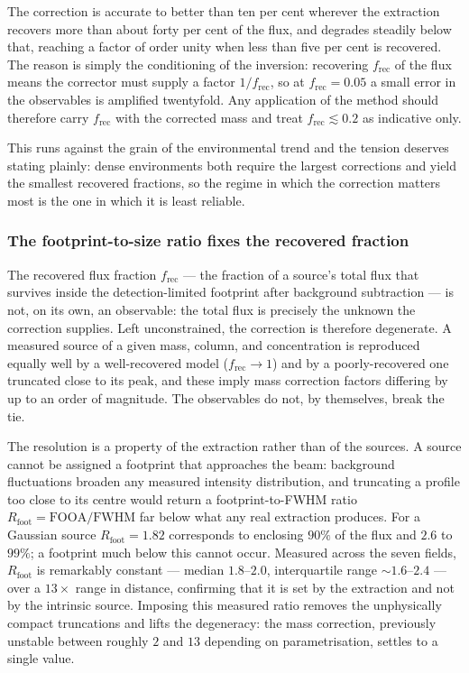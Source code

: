 \documentclass[11pt,a4paper]{article}
\begin{document}
The correction is accurate to better than ten per cent wherever the extraction
recovers more than about forty per cent of the flux, and degrades steadily
below that, reaching a factor of order unity when less than five per cent is
recovered. The reason is simply the conditioning of the inversion: recovering
$f_{\mathrm{rec}}$ of the flux means the corrector must supply a factor
$1/f_{\mathrm{rec}}$, so at $f_{\mathrm{rec}}=0.05$ a small error in the
observables is amplified twentyfold. Any application of the method should
therefore carry $f_{\mathrm{rec}}$ with the corrected mass and treat
$f_{\mathrm{rec}}\lesssim0.2$ as indicative only.

This runs against the grain of the environmental trend and the tension deserves
stating plainly: dense environments both require the largest corrections and
yield the smallest recovered fractions, so the regime in which the correction
matters most is the one in which it is least reliable.

\subsubsection{The footprint-to-size ratio fixes the recovered fraction}
\label{sec:footprint}

The recovered flux fraction $f_{\mathrm{rec}}$ --- the fraction of a source's
total flux that survives inside the detection-limited footprint after
background subtraction --- is not, on its own, an observable: the total flux is
precisely the unknown the correction supplies. Left unconstrained, the
correction is therefore degenerate. A measured source of a given mass, column,
and concentration is reproduced equally well by a well-recovered model
($f_{\mathrm{rec}}\!\to\!1$) and by a poorly-recovered one truncated close to
its peak, and these imply mass correction factors differing by up to an order
of magnitude. The observables do not, by themselves, break the tie.

The resolution is a property of the extraction rather than of the sources. A
source cannot be assigned a footprint that approaches the beam: background
fluctuations broaden any measured intensity distribution, and truncating a
profile too close to its centre would return a footprint-to-FWHM ratio
$R_{\mathrm{foot}}=\mathrm{FOOA}/\mathrm{FWHM}$ far below what any real
extraction produces. For a Gaussian source $R_{\mathrm{foot}}=1.82$ corresponds
to enclosing $90\%$ of the flux and $2.6$ to $99\%$; a footprint much below
this cannot occur. Measured across the seven fields, $R_{\mathrm{foot}}$ is
remarkably constant --- median $1.8$--$2.0$, interquartile range
$\sim1.6$--$2.4$ --- over a $13\times$ range in distance, confirming that it is
set by the extraction and not by the intrinsic source. Imposing this measured
ratio removes the unphysically compact truncations and lifts the degeneracy:
the mass correction, previously unstable between roughly $2$ and $13$ depending
on parametrisation, settles to a single value.
\end{document}
